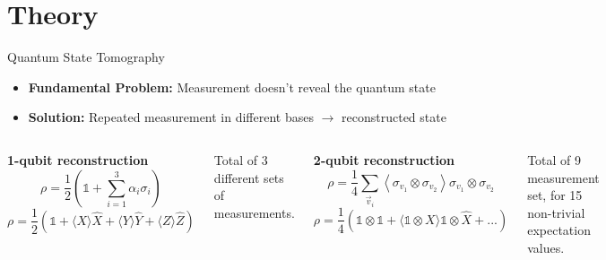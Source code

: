 \section{Theory}

\begin{frame}{Quantum State Tomography}
  \begin{itemize}
  \item \textbf{Fundamental Problem:} Measurement doesn't reveal the quantum state
  \item \textbf{Solution:} Repeated measurement in different bases $\rightarrow$
      reconstructed state
  \end{itemize}
  \vspace{0.5cm}

  \begin{columns}
    \centering \textbf{1-qubit reconstruction}
      \begin{equation*}
        \rho=\frac{1}{2}\left(\mathbb{1}+\sum_{i=1}^3\alpha_i\sigma_i\right)
      \end{equation*}
      \begin{equation*}
        \rho=\frac{1}{2}\left(\mathbb{1}
          + \langle X \rangle \hat{X}
          + \langle Y \rangle \hat{Y}
          + \langle Z \rangle \hat{Z} \right)
      \end{equation*}

      \vspace{0.7cm}
      Total of 3 different sets of measurements.

    \centering \textbf{2-qubit reconstruction}
    \begin{equation*}
      \rho=\frac{1}{4}\sum_{\vec{v}_i}\left\langle\sigma_{v_1}
        \otimes\sigma_{v_2}\right\rangle\sigma_{v_1}\otimes\sigma_{v_2} 
    \end{equation*}
    \begin{equation*}
      \rho=\frac{1}{4}\left(\mathbb{1} \otimes \mathbb{1}
        + \langle \mathbb{1} \otimes X \rangle \mathbb{1} \otimes \hat{X} +
         ...\right)
    \end{equation*}

    \vspace{0.7cm}
    Total of 9 measurement set, for 15 non-trivial expectation values.

  \end{columns} 
\end{frame}



